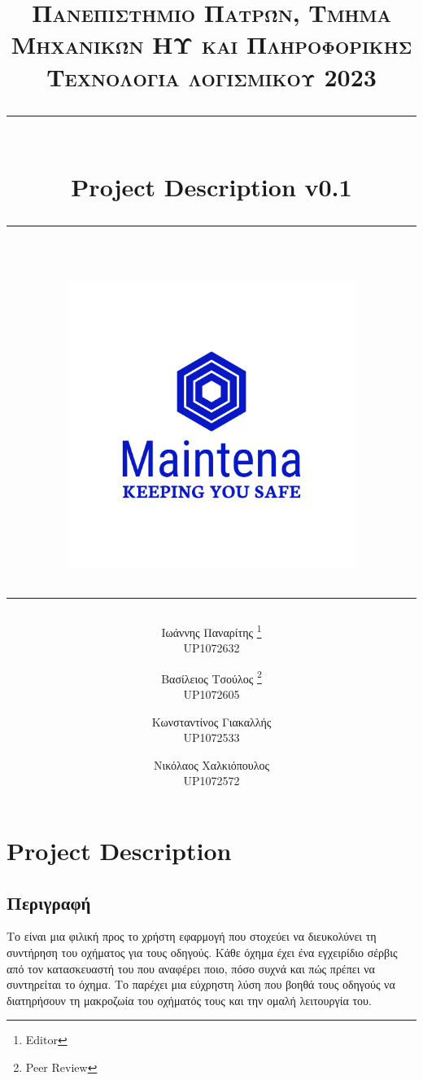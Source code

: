 \documentclass[11pt]{scrartcl} %
\title{	
	\normalfont\normalsize
	\textsc{Πανεπιστήμιο Πατρών, Τμήμα Μηχανικών ΗΥ και Πληροφορικής \\Τεχνολογία λογισμικού 2023}\\ %
	\vspace{25pt} %
	\rule{\linewidth}{0.5pt}\\ %
	\vspace{20pt} %
    {\Large Project Description v0.1}\\ %
	\vspace{12pt} %
	\rule{\linewidth}{0.5pt}\\ %
	\vspace{12pt} %
    \includegraphics[width=0.7\textwidth]{../../brand/png/logo-transparent.png}
        \rule{\linewidth}{2pt}
}
\author{
Ιωάννης Παναρίτης \thanks{Editor} \\UP1072632 \and Βασίλειος Τσούλος \thanks{Peer Review} \\UP1072605 \and Κωνσταντίνος Γιακαλλής \\UP1072533 \and \hspace{-0.9cm} Νικόλαος Χαλκιόπουλος \\ \hspace{-0.9cm}UP1072572
}
\date{} %
\begin{document}
\maketitle
\pagebreak
\Large


\section*{Project Description}

\subsection*{Περιγραφή}

Το  είναι μια φιλική προς το χρήστη εφαρμογή που στοχεύει να διευκολύνει τη συντήρηση του οχήματος για τους οδηγούς. Κάθε όχημα έχει ένα εγχειρίδιο σέρβις από τον κατασκευαστή του που αναφέρει ποιο, πόσο συχνά και πώς πρέπει να συντηρείται το όχημα. Το  παρέχει μια εύχρηστη λύση που βοηθά τους οδηγούς να διατηρήσουν τη μακροζωία του οχήματός τους και την ομαλή λειτουργία του.
\end{document}
